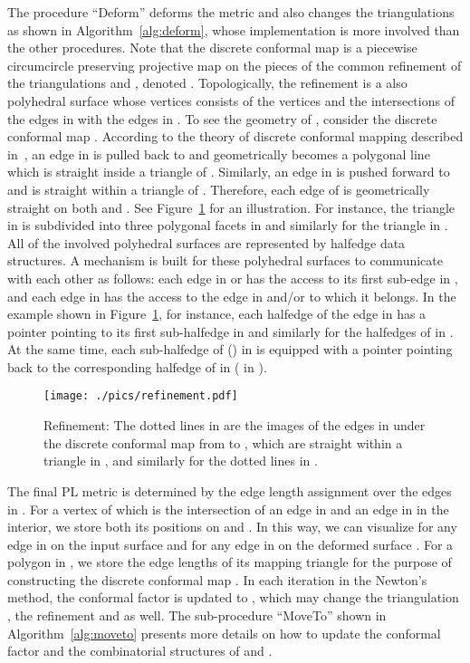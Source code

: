 \documentclass[11pt]{article}
\begin{document}
The procedure ``Deform'' deforms the metric and also changes the triangulations as shown 
in Algorithm~\ref{alg:deform}, whose implementation is more involved than the other procedures. 
Note that the discrete conformal map  is a piecewise circumcircle preserving projective map 
on the pieces of the common refinement of the triangulations  and , denoted . 
Topologically, the refinement 
is a also polyhedral surface whose vertices consists of the
vertices  and the intersections of the edges in 
with the edges in . To see the geometry of ,
consider the discrete conformal map .
According to the theory of discrete conformal mapping described in~\cite{glsw2},
an edge in  is pulled back to  and geometrically
becomes a polygonal line which is straight inside a triangle of . 
Similarly, an edge in  is pushed forward
to  and is straight within a triangle of . Therefore,
each edge of  is geometrically straight on both  and .
See Figure~\ref{fig:refinement} for an illustration. For instance, the triangle  in
 is subdivided into three polygonal facets in  and similarly
for the triangle  in .
All of the involved polyhedral surfaces are represented by halfedge data structures.  
A mechanism is built for these polyhedral surfaces to communicate with each other as follows:
each edge in  or  has the access to its first sub-edge in ,
and each edge in  has the access to the edge in  and/or 
to which it belongs. In the example shown in Figure~\ref{fig:refinement}, for instance,
each halfedge of the edge  in  has a pointer pointing to its first
sub-halfedge in  and similarly for the halfedges of  in .
At the same time, each sub-halfedge of  () in  is equipped
with a pointer pointing back to the corresponding halfedge of  in 
( in ).

\begin{figure}[!t]
\centering
\texttt{[image: ./pics/refinement.pdf]}
\vspace{0.1in}
\caption{Refinement: The dotted lines in   are the images
of the edges in  under the discrete conformal map from  to  ,
which are straight within a triangle in , and similarly for the dotted lines in .
}
\label{fig:refinement}
\end{figure}



The final PL metric is determined by the edge length assignment  over the edges in .
For a vertex  of  which is the intersection of an edge  in  and 
an edge  in  in the interior, we store both its positions on  and . In this way, 
we can visualize  for any edge  in  on the input surface 
 and  for any edge  in  on the deformed surface . 
For a polygon  in , we store the edge lengths of its mapping triangle
for the purpose of constructing the discrete conformal map .  
In each iteration in the Newton's method, the conformal factor  is updated to , 
which may change the triangulation , the refinement  and  as well. 
The sub-procedure ``MoveTo'' shown in Algorithm~\ref{alg:moveto} presents more details on how to 
update the conformal factor and the combinatorial structures of  and . 
\end{document}
